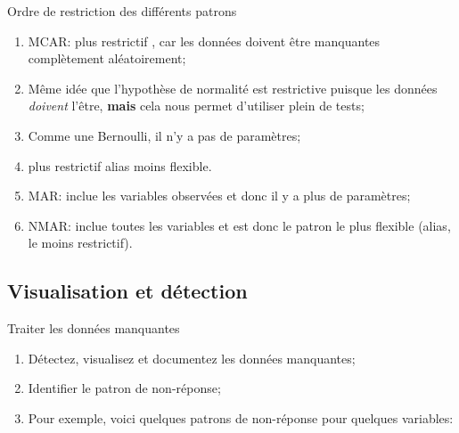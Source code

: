 \documentclass[10pt, french]{article}
\begin{document}
\begin{multicols*}{3}
Ordre de restriction des différents patrons
\begin{enumerate}[leftmargin = *]
	\item	MCAR: plus \og restrictif \fg{}, car les données doivent être manquantes complètement aléatoirement;
	\item[]	Même idée que l'hypothèse de normalité est restrictive puisque les données \textit{doivent} l'être, \textbf{mais} cela nous permet d'utiliser plein de tests;
	\item[]	Comme une Bernoulli, il n'y a pas de paramètres;
	\item[]	plus restrictif alias moins flexible.
	\item	MAR: inclue les variables observées et donc il y a plus de paramètres;
	\item	NMAR: inclue toutes les variables et est donc le patron le plus flexible (alias, le moins restrictif).
\end{enumerate}

\subsection*{Visualisation et détection}
\begin{algo}{Traiter les données manquantes}
\begin{enumerate}[leftmargin = *]
	\item	Détectez, visualisez et documentez les données manquantes;
	\item	Identifier le patron de non-réponse;
	\item[]	Pour exemple, voici quelques patrons de non-réponse pour quelques variables:


\end{enumerate}
\end{algo}
\end{multicols*}
\end{document}
